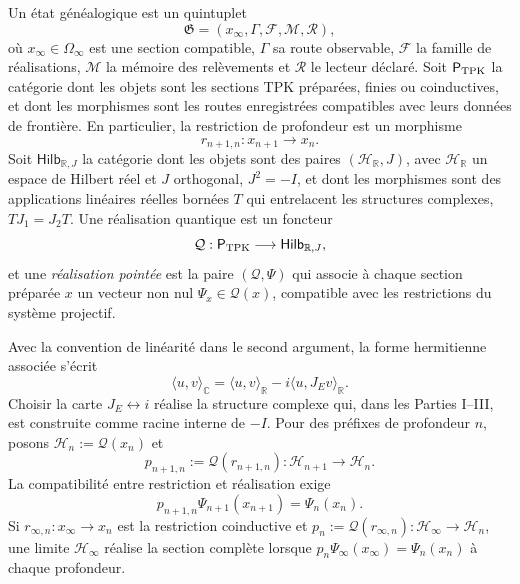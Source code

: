 \begin{definition}
Un état généalogique est un quintuplet
\begin{equation}
 \mathfrak G=(x_\infty,\Gamma,\mathcal F,\mathcal M,\mathcal R),
 \label{eq:estado-genealogico-realizado-rev2}
\end{equation}
où \(x_\infty\in\Omega_\infty\) est une section compatible,
\(\Gamma\) sa route observable, \(\mathcal F\) la famille de réalisations,
\(\mathcal M\) la mémoire des relèvements et \(\mathcal R\) le lecteur
déclaré. Soit \(\mathsf P_{\rm TPK}\) la catégorie dont les objets sont les
sections TPK préparées, finies ou coinductives, et dont les morphismes sont les
routes enregistrées compatibles avec leurs données de frontière. En particulier, la
restriction de profondeur est un morphisme
\[
 r_{n+1,n}:x_{n+1}\longrightarrow x_n.
\]
Soit \(\mathsf{Hilb}_{\mathbb R,J}\) la catégorie dont les objets
sont des paires \((\mathcal H_{\mathbb R},J)\), avec \(\mathcal H_{\mathbb R}\)
un espace de Hilbert réel et \(J\) orthogonal, \(J^2=-I\), et dont les morphismes sont
des applications linéaires réelles bornées \(T\) qui entrelacent les structures
complexes, \(TJ_1=J_2T\). Une réalisation quantique est un foncteur
\[
 \mathcal Q:\mathsf P_{\rm TPK}\longrightarrow
 \mathsf{Hilb}_{\mathbb R,J},
\]
et une \emph{réalisation pointée} est la paire \((\mathcal Q,\Psi)\) qui associe
à chaque section préparée \(x\) un vecteur non nul
\(\Psi_x\in\mathcal Q(x)\), compatible avec les restrictions du système
projectif.
\end{definition}

Avec la convention de linéarité dans le second argument, la forme hermitienne associée
s’écrit
\[
 \langle u,v\rangle_{\mathbb C}
 =\langle u,v\rangle_{\mathbb R}
  -i\langle u,J_E v\rangle_{\mathbb R}.
\]
Choisir la carte \(J_E\leftrightarrow i\) réalise la structure complexe qui, dans les Parties I--III, est construite comme racine interne de \(-I\). Pour des préfixes de profondeur \(n\), posons \(\mathcal H_n:=\mathcal Q(x_n)\) et
\[
 p_{n+1,n}:=\mathcal Q(r_{n+1,n}):
 \mathcal H_{n+1}\longrightarrow\mathcal H_n.
\]
La compatibilité entre restriction et réalisation exige
\begin{equation}
 p_{n+1,n}\Psi_{n+1}(x_{n+1})=\Psi_n(x_n).
 \label{eq:compatibilidad-realizacion-hilbert-rev2}
\end{equation}
Si \(r_{\infty,n}:x_\infty\to x_n\) est la restriction coinductive et
\(p_n:=\mathcal Q(r_{\infty,n}):\mathcal H_\infty\to\mathcal H_n\), une
limite \(\mathcal H_\infty\) réalise la section complète lorsque
\(p_n\Psi_\infty(x_\infty)=\Psi_n(x_n)\) à chaque profondeur.

